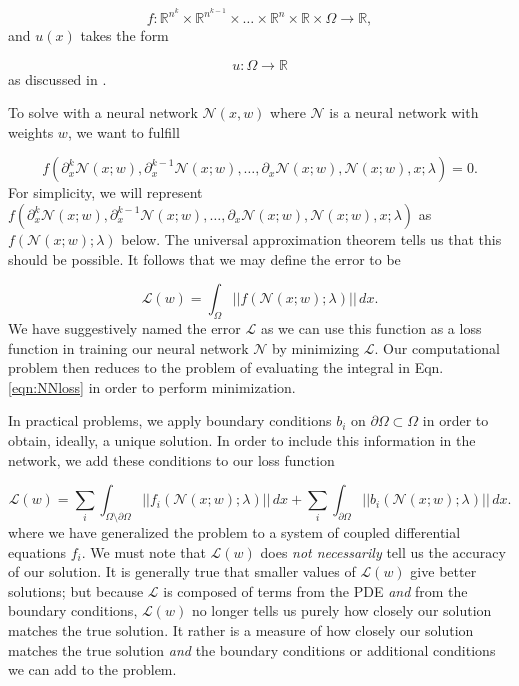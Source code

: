 \documentclass{CUP-JNL-DTM}%
\theoremstyle{definition}
\numberwithin{equation}{section}
\newcommand{\loss}{\mathcal{L}}
\newcommand{\net}{\mathcal{N}}
\begin{document}
\begin{equation}
    f: \mathbb{R}^{n^k} \times \mathbb{R}^{n^{k-1}} \times \dots \times \mathbb{R}^n \times \mathbb{R} \times \Omega \rightarrow \mathbb{R},
\end{equation}
and $u(x)$ takes the form

\begin{equation}
    u : \Omega \rightarrow \mathbb{R}
\end{equation}
as discussed in \cite{evansPartialDifferentialEquations2010}. 

To solve with a neural network $\net(x, w)$ where $\net$ is a neural network with weights $w$, we want to fulfill 

\begin{equation}
	f(\partial^k_x\net(x;w), \partial^{k-1}_x \net(x;w), \dots, \partial_x \net(x;w), \net(x;w), x; \lambda) = 0.
	\label{eqn:NNapprox}
\end{equation}
For simplicity, we will represent $f(\partial^k_x\net(x;w), \partial^{k-1}_x \net(x;w), \dots, \partial_x \net(x;w), \net(x;w), x; \lambda)$ as $f(\net(x;w); \lambda)$ below. The universal approximation theorem tells us that this should be possible. It follows that we may define the error to be 

\begin{equation}
	\loss(w) = \int_{\Omega} ||f(\net(x;w); \lambda)||\,dx. 
	\label{eqn:NNloss}
\end{equation}
We have suggestively named the error $\loss$ as we can use this function as a loss function in training our neural network $\net$ by minimizing $\loss$. Our computational problem then reduces to the problem of evaluating the integral in Eqn. \ref{eqn:NNloss} in order to perform minimization. 

In practical problems, we apply boundary conditions $b_i$ on $\partial \Omega \subset \Omega$ in order to obtain, ideally, a unique solution. In order to include this information in the network, we add these conditions to our loss function

\begin{equation}
	\loss(w) = \sum_i\int_{\Omega\setminus\partial\Omega} ||f_i(\net(x;w); \lambda)||\,dx + \sum_i\int_{\partial\Omega} ||b_i(\net(x;w); \lambda)||\,dx.
	\label{eqn:complete_loss} 
\end{equation}
where we have generalized the problem to a system of coupled differential equations $f_i$. We must note that $\loss(w)$ does \emph{not necessarily} tell us the accuracy of our solution. It is generally true that smaller values of $\loss(w)$ give better solutions; but because $\loss$ is composed of terms from the PDE \emph{and} from the boundary conditions, $\loss(w)$ no longer tells us purely how closely our solution matches the true solution. It rather is a measure of how closely our solution matches the true solution \emph{and} the boundary conditions or additional conditions we can add to the problem. 
\end{document}
